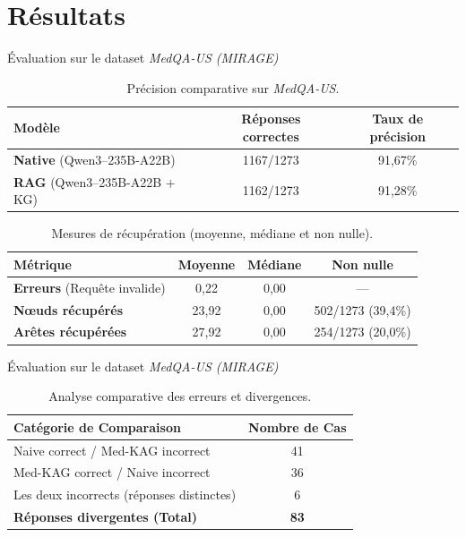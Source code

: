 \section{Résultats}

\begin{frame}{Évaluation sur le dataset \emph{MedQA-US
  (MIRAGE)}~\cite{xiong2024benchmarkingretrievalaugmentedgenerationmedicine}}
  \begin{table}
    \centering
    \begin{tabular}{lcc}
      \toprule
      \textbf{Modèle} & \textbf{Réponses correctes} & \textbf{Taux
      de précision} \\
      \midrule
      \textbf{Native} (Qwen3--235B-A22B) & 1167/1273 & 91,67\% \\
      \textbf{RAG} (Qwen3--235B-A22B + KG) & 1162/1273 & 91,28\% \\
      \bottomrule
    \end{tabular}
    \caption{Précision comparative sur \emph{MedQA-US}.}
  \end{table}

  \pause[]

  \begin{table}
    \centering
    \begin{tabular}{lccc}
      \toprule
      \textbf{Métrique} & \textbf{Moyenne} & \textbf{Médiane} &
      \textbf{Non nulle} \\
      \midrule
      \textbf{Erreurs} (Requête invalide) & 0,22 & 0,00 & --- \\
      \textbf{N\oe{}uds récupérés} & 23,92 & 0,00 & 502/1273 (39,4\%) \\
      \textbf{Arêtes récupérées} & 27,92 & 0,00 & 254/1273 (20,0\%) \\
      \bottomrule
    \end{tabular}
    \caption{Mesures de récupération (moyenne, médiane et non nulle).}
  \end{table}
\end{frame}

\begin{frame}{Évaluation sur le dataset \emph{MedQA-US
  (MIRAGE)}~\cite{xiong2024benchmarkingretrievalaugmentedgenerationmedicine}}
  \begin{table}[h]
    \centering
    \begin{tabular}{lc}
      \toprule
      \textbf{Catégorie de Comparaison} & \textbf{Nombre de Cas} \\
      \midrule
      \quad Naive correct / Med-KAG incorrect & 41 \\
      \quad Med-KAG correct / Naive incorrect & 36 \\
      \quad Les deux incorrects (réponses distinctes) & 6 \\
      \textbf{Réponses divergentes (Total)} & \textbf{83} \\
      \bottomrule
    \end{tabular}
    \caption{Analyse comparative des erreurs et divergences.}
  \end{table}
\end{frame}

